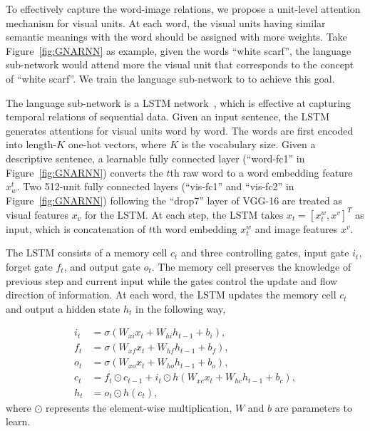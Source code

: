 To effectively capture the word-image relations, we propose a unit-level attention mechanism for visual units. At each word, the visual units having similar semantic meanings with the word should be assigned with more weights. Take Figure~\ref{fig:GNARNN} as example, given the words ``white scarf'', the language sub-network would attend more the visual unit that corresponds to the concept of ``white scarf''.
We train the language sub-network to to achieve this goal.

The language sub-network is a LSTM network~\cite{hochreiter1997long}, which is effective at capturing temporal relations of sequential data. Given an input sentence, the LSTM generates attentions for visual units word by word. The words are first encoded into length-$K$ one-hot vectors, where $K$ is the vocabulary size. Given a descriptive sentence, a learnable fully connected layer (``word-fc1'' in Figure~\ref{fig:GNARNN}) converts the $t$th raw word to a word embedding feature $x^t_w$. Two 512-unit fully connected layers (``vis-fc1'' and ``vis-fc2'' in Figure~\ref{fig:GNARNN}) following the ``drop7''  layer of VGG-16 are treated as visual features $x_v$ for the LSTM. 
At each step, the LSTM takes $x_t = [x_t^w, x^v]^T$ as input, which is concatenation of $t$th word embedding $x^w_t$ and image features $x^v$. 

The LSTM consists of a memory cell $c_t$ and three controlling gates, \ie input gate $i_t$, forget gate $f_t$, and output gate $o_t$. The memory cell preserves the knowledge of previous step and current input while the gates control the update and flow direction of information.
At each word, the LSTM updates the memory cell $c_t$ and output a hidden state $h_t$ in the following way,

\begin{align}
i_t &= \sigma{(W_{xi} x_t + W_{hi} h_{t-1} + b_i)}, \nonumber \\
f_t &= \sigma{(W_{xf} x_t + W_{hf} h_{t-1} + b_f)}, \nonumber \\
o_t &= \sigma{(W_{xo} x_t + W_{ho} h_{t-1} + b_o)}, \\
c_t &= f_t \odot c_{t-1} + i_t \odot h{(W_{xc} x_t + W_{hc} h_{t-1} + b_c)}, \nonumber\\
h_t &= o_t \odot h{(c_t)}, \nonumber
\end{align}
where $\odot$ represents the element-wise multiplication, $W$ and $b$ are parameters to learn. 

